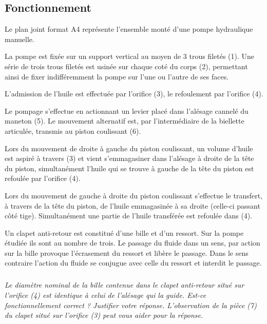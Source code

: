 \ifprof
\begin{multicols}{2}
\else
\begin{multicols}{2}
\fi


\subsection*{Fonctionnement}

Le plan joint format A4 représente l’ensemble monté d’une pompe hydraulique manuelle.

La pompe est fixée sur un support vertical au moyen de 3 trous filetés (1). Une série de trois trous filetés est usinée sur chaque coté du corps (2), permettant ainsi de fixer indifféremment la pompe sur l’une ou l’autre de ses faces.

L’admission de l’huile est effectuée par l’orifice (3), le refoulement par l’orifice (4).

Le pompage s’effectue en actionnant un levier placé dans l’alésage cannelé du maneton (5). Le mouvement alternatif est, par l’intermédiaire de la biellette articulée, transmis au piston coulissant (6).

Lors du mouvement de droite à gauche du piston coulissant, un volume d’huile est aspiré à travers (3) et vient s’emmagasiner dans l’alésage à droite de la tête du piston, simultanément l’huile qui se trouve à gauche de la tête du piston est refoulée par l’orifice (4).

Lors du mouvement de gauche à droite du piston coulissant s’effectue le transfert, à travers de la tête du piston, de l’huile emmagasinée à sa droite (celle-ci passant côté tige). Simultanément une partie de l’huile transférée est refoulée dans (4).

Un clapet anti-retour est constitué d’une bille et d’un ressort. Sur la pompe étudiée ils sont au nombre de trois. 
Le passage du fluide dans un sens, par action sur la bille provoque l’écrasement du ressort et libère le passage. 
Dans le sens contraire l’action du fluide se conjugue avec celle du ressort et interdit le passage. 



\subparagraph{}
\textit{Le diamètre nominal de la bille contenue dans le clapet anti-retour situé sur l’orifice (4) est identique à celui de l’alésage qui la guide. Est-ce fonctionnellement correct ? Justifier votre réponse. L’observation de la pièce (7) du clapet situé sur l’orifice (3) peut vous aider pour la réponse.}


\end{multicols}
\end{multicols}
